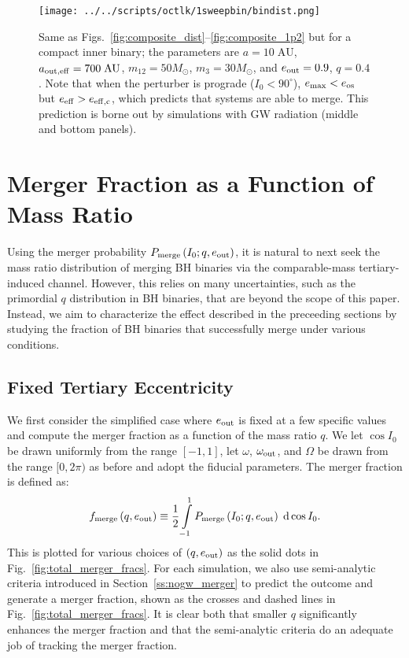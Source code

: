 \documentclass[
        fleqn,
        usenatbib,
    ]{mnras}
\newcommand*{\p}[1]{\left(#1\right)}
\newlength{\colummwidth}
\begin{document}
\begin{figure}
    \centering
    \texttt{[image: ../../scripts/octlk/1sweepbin/bindist.png]}
    \caption{Same as Figs.~\ref{fig:composite_dist}--\ref{fig:composite_1p2}
    but for a compact inner binary; the parameters are $a = 10\;\mathrm{AU}$,
    $a_{\rm out, eff} = 700\;\mathrm{AU}$, $m_{12} = 50M_{\odot}$, $m_3 =
    30M_{\odot}$, and $e_{\rm out} = 0.9$, $q = 0.4$. Note that when the
    perturber is prograde ($I_0 < 90^\circ$), $e_{\max} <
    e_{\rm os}$ but $e_{\rm eff} > e_{\rm eff, c}$, which predicts that systems
    are able to merge. This prediction is borne out by simulations with GW
    radiation (middle and bottom panels). }\label{fig:composite_bindist}
\end{figure}

\section{Merger Fraction as a Function of Mass Ratio}

Using the merger probability $P_{\rm merge}\p{I_0; q, e_{\rm out}}$, it is
natural to next seek the mass ratio distribution of merging BH binaries via the
comparable-mass tertiary-induced channel. However, this relies on many
uncertainties, such as the primordial $q$ distribution in BH binaries, that are
beyond the scope of this paper. Instead, we aim to characterize the effect
described in the preceeding sections by studying the fraction of BH binaries
that successfully merge under various conditions.

\subsection{Fixed Tertiary Eccentricity}

We first consider the simplified case where $e_{\rm out}$ is fixed at a few
specific values and compute the merger fraction as a function of the mass ratio
$q$. We let $\cos I_0$ be drawn uniformly from the range $[-1, 1]$, let
$\omega$, $\omega_{\rm out}$, and $\Omega$ be drawn from the range $[0,
2\pi)$ as before%
and adopt the fiducial parameters. The merger fraction is defined as:
\begin{equation}
    f_{\rm merge}\p{q, e_{\rm out}} \equiv
        \frac{1}{2}\int\limits_{-1}^1P_{\rm merge}\p{I_0; q, e_{\rm out}}
            \;\mathrm{d}\cos I_0.
\end{equation}
This is plotted for various choices of $\p{q, e_{\rm out}}$ as the solid dots in
Fig.~\ref{fig:total_merger_fracs}. For each simulation, we also use
semi-analytic criteria introduced in Section~\ref{ss:nogw_merger} to predict the
outcome and generate a merger fraction, shown as the crosses and dashed lines in
Fig.~\ref{fig:total_merger_fracs}. It is clear both that smaller $q$
significantly enhances the merger fraction and that the semi-analytic criteria
do an adequate job of tracking the merger fraction.
\end{document}
